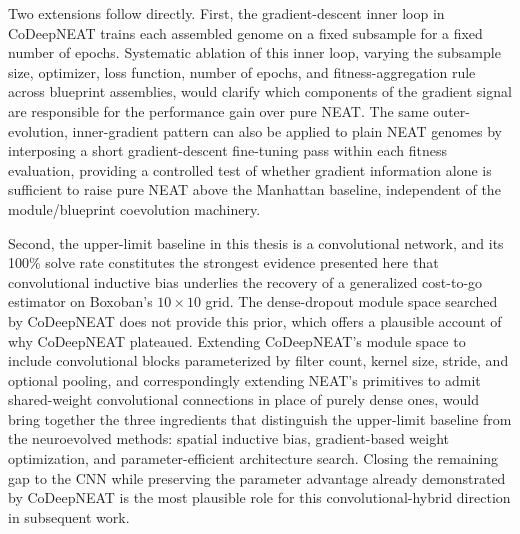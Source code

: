 Two extensions follow directly. First, the gradient-descent inner loop in CoDeepNEAT
trains each assembled genome on a fixed subsample for a fixed number of epochs.
Systematic ablation of this inner loop, varying the subsample size, optimizer, loss
function, number of epochs, and fitness-aggregation rule across blueprint assemblies,
would clarify which components of the gradient signal are responsible for the
performance gain over pure NEAT. The same outer-evolution, inner-gradient pattern can
also be applied to plain NEAT genomes by interposing a short gradient-descent
fine-tuning pass within each fitness evaluation, providing a controlled test of whether
gradient information alone is sufficient to raise pure NEAT above the Manhattan
baseline, independent of the module/blueprint coevolution machinery.

Second, the upper-limit baseline in this thesis is a convolutional network, and its
100\% solve rate constitutes the strongest evidence presented here that convolutional
inductive bias underlies the recovery of a generalized cost-to-go estimator on
Boxoban's $10 \times 10$ grid. The dense-dropout module space searched by CoDeepNEAT
does not provide this prior, which offers a plausible account of why CoDeepNEAT
plateaued. Extending CoDeepNEAT's module space to include convolutional
blocks parameterized by filter count, kernel size, stride, and optional pooling, and
correspondingly extending NEAT's primitives to admit shared-weight convolutional
connections in place of purely dense ones, would bring together the three ingredients
that distinguish the upper-limit baseline from the neuroevolved methods: spatial
inductive bias, gradient-based weight optimization, and parameter-efficient architecture
search. Closing the remaining gap to the CNN while preserving the parameter
advantage already demonstrated by CoDeepNEAT is the most plausible role for this
convolutional-hybrid direction in subsequent work.
